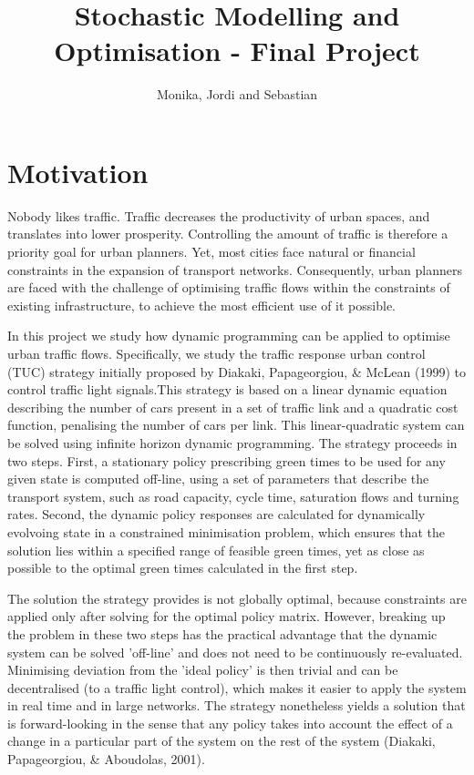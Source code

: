 \documentclass[11pt]{article}
\begin{document}
\author{Monika, Jordi and Sebastian}
\title{Stochastic Modelling and Optimisation - Final Project}
\maketitle

\medskip

\section{Motivation}
Nobody likes traffic. Traffic decreases the productivity of urban spaces, and translates into lower prosperity. Controlling the amount of traffic is therefore a priority goal for urban planners. Yet, most cities face natural or financial constraints in the expansion of transport networks. Consequently,  urban planners are faced with the challenge of optimising traffic flows within the constraints of existing infrastructure, to achieve the most efficient use of it possible.

In this project we study how dynamic programming can be applied to optimise urban traffic flows. Specifically, we study the traffic response urban control (TUC) strategy initially proposed by Diakaki, Papageorgiou, \& McLean (1999) to control traffic light signals.This strategy is based on a linear dynamic equation describing the number of cars present in a set of traffic link and a quadratic cost function, penalising the number of cars per link. This linear-quadratic system can be solved using infinite horizon dynamic programming. The strategy proceeds in two steps. First, a stationary policy prescribing green times to be used for any given state is computed off-line, using a set of parameters that describe the transport system, such as road capacity, cycle time, saturation flows and turning rates. Second, the dynamic policy responses are calculated for dynamically evolvoing state in a constrained minimisation problem, which ensures that the solution lies within a specified range of feasible green times, yet as close as possible to the optimal green times calculated in the first step. 

The solution the strategy provides is not globally optimal, because constraints are applied only after solving for the optimal policy matrix. However, breaking up the problem in these two steps has the practical advantage that the dynamic system can be solved 'off-line' and does not need to be continuously re-evaluated. Minimising deviation from the 'ideal policy' is then trivial and can be decentralised (to a traffic light control), which makes it easier to apply the system in real time and in large networks. The strategy nonetheless yields a solution that is forward-looking in the sense that any policy takes into account the effect of a change in a particular part of the system on the rest of the system (Diakaki, Papageorgiou, \& Aboudolas, 2001).
\end{document}
